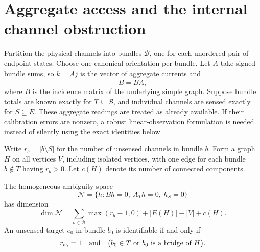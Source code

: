 \section{Aggregate access and the internal channel obstruction}

Partition the physical channels into bundles $\mathcal B$, one for each
unordered pair of endpoint states. Choose one canonical orientation per bundle.
Let $A$ take signed bundle sums, so $k=Aj$ is the vector of aggregate currents
and
\begin{equation}
 B=\bar B A,
 \label{eq:graph-bundle-factorization}
\end{equation}
where $\bar B$ is the incidence matrix of the underlying simple graph.
Suppose bundle totals are known exactly for $T\subseteq\mathcal B$, and
individual channels are sensed exactly for $S\subseteq E$. These aggregate
readings are treated as already available. If their calibration errors are
nonzero, a robust linear-observation formulation is needed instead of silently
using the exact identities below.

Write $r_b=|b\setminus S|$ for the number of unsensed channels in bundle $b$.
Form a graph $H$ on all vertices $V$, including isolated vertices, with one
edge for each bundle $b\notin T$ having $r_b>0$. Let $c(H)$ denote its number
of connected components.

\begin{theorem}
\label{thm:graph-mixed-access}
The homogeneous ambiguity space
\begin{equation}
 \mathcal N=\{h:Bh=0,\ A_T h=0,\ h_S=0\}
\end{equation}
has dimension
\begin{equation}
 \dim\mathcal N
 =\sum_{b\in\mathcal B}\max(r_b-1,0)
       +|E(H)|-|V|+c(H).
 \label{eq:graph-mixed-dimension}
\end{equation}
An unsensed target $e_0$ in bundle $b_0$ is identifiable if and only if
\begin{equation}
 r_{b_0}=1
 \quad\hbox{and}\quad
 \bigl(b_0\in T\ \hbox{or $b_0$ is a bridge of $H$}\bigr).
 \label{eq:graph-mixed-target}
\end{equation}
\end{theorem}

